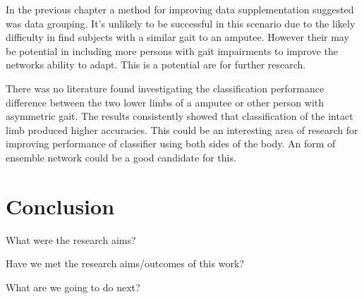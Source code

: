 In the previous chapter a method for improving data supplementation suggested was data grouping. It's unlikely to be successful in this scenario due to the likely difficulty in find subjects with a similar gait to an amputee. However their may be potential in including more persons with gait impairments to improve the networks ability to adapt. This is a potential are for further research.

There was no literature found investigating the classification performance difference between the two lower limbs of a amputee or other person with asymmetric gait. The results consistently showed that classification of the intact limb produced higher accuracies. This could be an interesting area of research for improving performance of classifier using both sides of the body. An form of ensemble network could be a good candidate for this.

\section{Conclusion}
\label{sec:amputee-conclusions}
What were the research aims?

Have we met the research aims/outcomes of this work?

What are we going to do next?